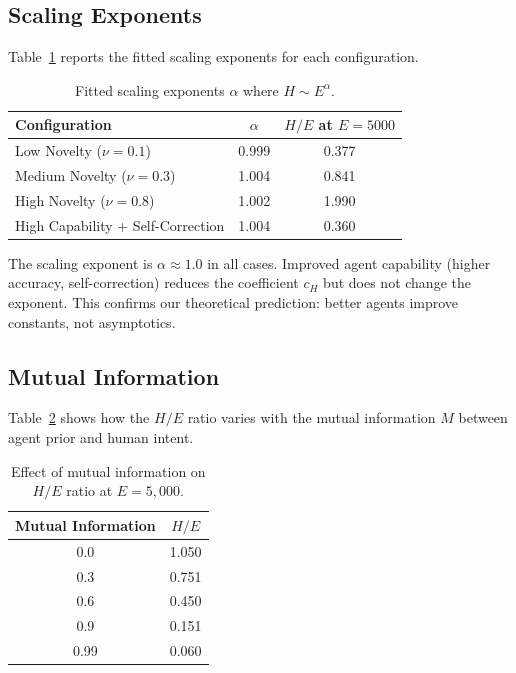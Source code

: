 \documentclass[11pt,a4paper]{article}
\begin{document}
\subsection{Scaling Exponents}

Table~\ref{tab:exponents} reports the fitted scaling exponents for each configuration.

\begin{table}[h]
\centering
\caption{Fitted scaling exponents $\alpha$ where $H \sim E^\alpha$.}
\begin{tabular}{lcc}
\toprule
Configuration & $\alpha$ & $H/E$ at $E{=}5000$ \\
\midrule
Low Novelty ($\nu = 0.1$) & 0.999 & 0.377 \\
Medium Novelty ($\nu = 0.3$) & 1.004 & 0.841 \\
High Novelty ($\nu = 0.8$) & 1.002 & 1.990 \\
High Capability + Self-Correction & 1.004 & 0.360 \\
\bottomrule
\end{tabular}
\label{tab:exponents}
\end{table}

The scaling exponent is $\alpha \approx 1.0$ in all cases. Improved agent capability (higher accuracy, self-correction) reduces the coefficient $c_H$ but does not change the exponent. This confirms our theoretical prediction: better agents improve constants, not asymptotics.

\subsection{Mutual Information}

Table~\ref{tab:mi} shows how the $H/E$ ratio varies with the mutual information $M$ between agent prior and human intent.

\begin{table}[h]
\centering
\caption{Effect of mutual information on $H/E$ ratio at $E = 5{,}000$.}
\begin{tabular}{cc}
\toprule
Mutual Information & $H/E$ \\
\midrule
0.0 & 1.050 \\
0.3 & 0.751 \\
0.6 & 0.450 \\
0.9 & 0.151 \\
0.99 & 0.060 \\
\bottomrule
\end{tabular}
\label{tab:mi}
\end{table}
\end{document}
